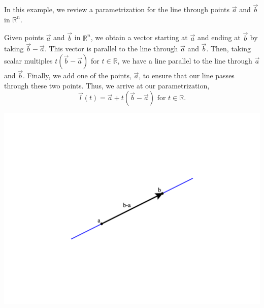 \documentclass{ximera}
\begin{document}
\begin{example}
In this example, we review a parametrization for the line through points $\vec{a}$ and $\vec{b}$ in $\mathbb{R}^n$.

Given points $\vec{a}$ and $\vec{b}$ in $\mathbb{R}^n$, we obtain a vector starting at $\vec{a}$ and ending at $\vec{b}$ by taking $\vec{b}-\vec{a}$. This vector is parallel to the line through $\vec{a}$ and $\vec{b}$. Then, taking scalar multiples $t(\vec{b} - \vec{a})$ for $t\in\mathbb{R}$, we have a line parallel to the line through $\vec{a}$ and $\vec{b}$. Finally, we add one of the points, $\vec{a}$, to ensure that our line passes through these two points. Thus, we arrive at our parametrization,
\[
\vec{l}(t) = \vec{a} + t(\vec{b}-\vec{a})\textrm{ for }t\in\mathbb{R}.
\]

\begin{image}
\includegraphics[width=\textwidth]{CalcPlot3D-line_para}
\end{image}
\end{example}
\end{document}
